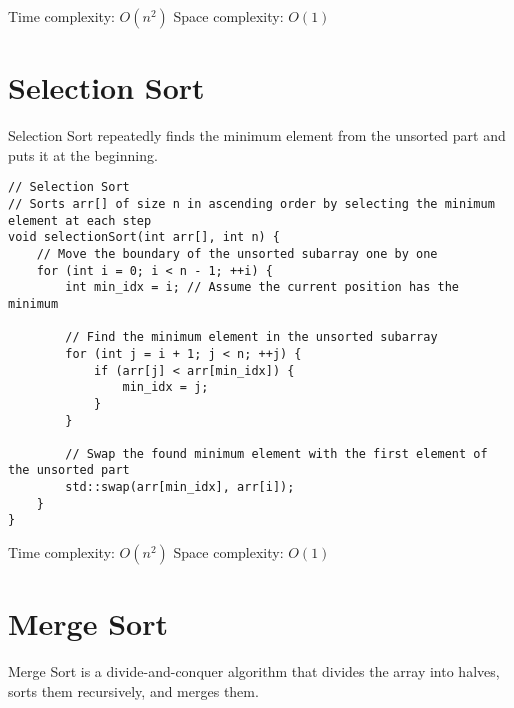 \documentclass{article}
\begin{document}
Time complexity: $O(n^2)$
Space complexity: $O(1)$

\section{Selection Sort}
Selection Sort repeatedly finds the minimum element from the unsorted part and puts it at the beginning.

\begin{lstlisting}[style=cppstyle]
// Selection Sort
// Sorts arr[] of size n in ascending order by selecting the minimum element at each step
void selectionSort(int arr[], int n) {
    // Move the boundary of the unsorted subarray one by one
    for (int i = 0; i < n - 1; ++i) {
        int min_idx = i; // Assume the current position has the minimum

        // Find the minimum element in the unsorted subarray
        for (int j = i + 1; j < n; ++j) {
            if (arr[j] < arr[min_idx]) {
                min_idx = j;
            }
        }

        // Swap the found minimum element with the first element of the unsorted part
        std::swap(arr[min_idx], arr[i]);
    }
}
\end{lstlisting}

Time complexity: $O(n^2)$
Space complexity: $O(1)$

\section{Merge Sort}
Merge Sort is a divide-and-conquer algorithm that divides the array into halves, sorts them recursively, and merges them.
\end{document}
